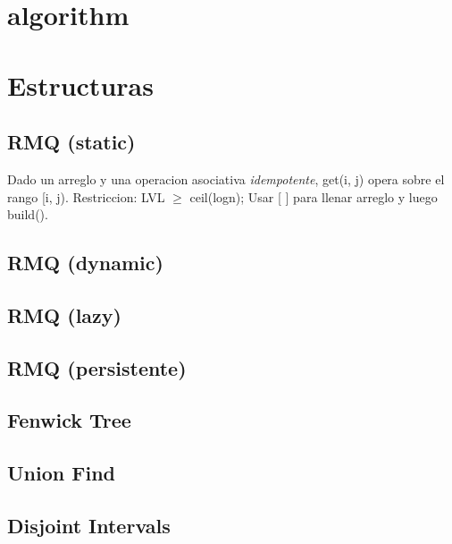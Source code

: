 

\def\title{Flower Power - Universidad Nacional de Rosario}
\tableofcontents\newpage
 
\section{algorithm}%



\section{Estructuras}%
\subsection{RMQ (static)}
Dado un arreglo y una operacion asociativa \emph{idempotente}, get(i, j) opera sobre el rango [i, j). Restriccion: LVL $\ge$ ceil(logn); Usar [ ] para llenar arreglo y luego build().
\subsection{RMQ (dynamic)}
\subsection{RMQ (lazy)}
\subsection{RMQ (persistente)}
\subsection{Fenwick Tree}
\subsection{Union Find}
\subsection{Disjoint Intervals}
